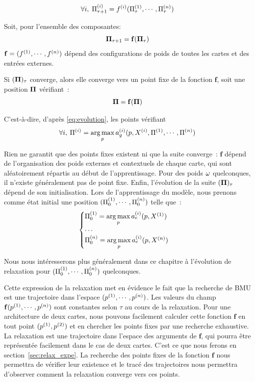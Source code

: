 \documentclass[../main]{subfiles}
\begin{document}
\begin{equation}
\forall i, \; \Pi^{({i})}_{\tau +1} = f^{({i})}(\Pi^{({1})}_\tau,\cdots,\Pi^{({n})}_\tau)
\label{eq:fonction}
\end{equation}

Soit, pour l'ensemble des composantes: 
\begin{equation}\label{eq:f}
\mathbf{\Pi}_{\tau+1} = \mathbf{f}(\mathbf{\Pi}_\tau)
\end{equation}
$\mathbf{f} = (f^{({1})}, \cdots, f^{({n})})$ dépend des configurations de poids de toutes les cartes et des entrées externes.

Si $(\mathbf{\Pi})_\tau$ converge, alors elle converge vers un point fixe de la fonction $\mathbf{f}$, soit une position $\mathbf{\Pi}$ vérifiant~:
\begin{equation}
\mathbf{\Pi} = \mathbf{f}(\mathbf{\Pi})
\label{eq:suite}
\end{equation}

C'est-à-dire, d'après \ref{eq:evolution}, les points vérifiant $$\forall i, \: \Pi^{({i})} = \operatorname*{arg\,max}\limits_p a_g^{({i})}(p, X^{({i})}, \Pi^{({1})}, \cdots, \Pi^{({n})})$$

Rien ne garantit que des points fixes existent ni que la suite converge~: $\mathbf{f}$ dépend de l'organisation des poids externes et contextuels de chaque carte, qui sont aléatoirement répartis au début de l'apprentissage.
Pour des poids $\omega$ quelconques, il n'existe généralement pas de point fixe.
Enfin, l'évolution de la suite $(\mathbf{\Pi})_{\tau}$ dépend de son initialisation.
Lors de l'apprentissage du modèle, nous prenons comme état initial une position $(\Pi^{({1})}_0, \cdots , \Pi^{({n})}_0)$  telle que~: 
\begin{equation}
\begin{cases}
\Pi^{({1})}_0 = \operatorname*{arg\,max}\limits_p a_e^{({i})}(p,X^{({1})})\\
\cdots \\
\Pi^{({n})}_0 = \operatorname*{arg\,max}\limits_p a_e^{({i})}(p,X^{({n})})\\
\end{cases}
\label{eq:init}
\end{equation}

Nous nous intéresserons plus généralement dans ce chapitre à l'évolution de relaxation pour $(\Pi^{({1})}_0, \cdots , \Pi^{({n})}_0)$ quelconques.

Cette expression de la relaxation met en évidence le fait que la recherche de BMU est une trajectoire dans l'espace $(p^{({1})}, \cdots, p^{({n})})$. Les valeurs du champ $\mathbf{f}(p^{({1})}, \cdots, p^{({n})})$ sont constantes selon $\tau$ au cours de la relaxation. Pour une architecture de deux cartes, nous pouvons facilement calculer cette fonction $\mathbf{f}$ en tout point $(p^{({1})}, p^{({2})})$ et en chercher les points fixes par une recherche exhaustive. 
La relaxation est une trajectoire dans l'espace des arguments de $\mathbf{f}$, qui pourra être représentée facilement dans le cas de deux cartes.
C'est ce que nous ferons en section~\ref{sec:relax_expe}.
La recherche des points fixes de la fonction $\mathbf{f}$ nous permettra de vérifier leur existence et le tracé des trajectoires nous permettra d'observer comment la relaxation converge vers ces points.
\end{document}
